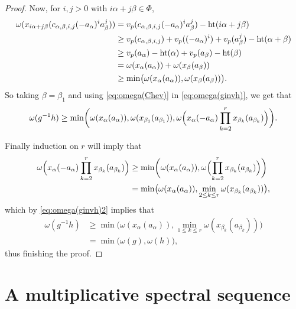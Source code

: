 \begin{proof}
Now, for $i,j>0$ with $i\alpha+j\beta \in \Phi$,
\begin{equation}\label{eq:omega(Chev)}
  \begin{aligned}
    \omega(x_{i\alpha+j\beta}(c_{\alpha,\beta,i,j}(-a_\alpha)^{i}a_\beta^{j})) &= v_p(c_{\alpha,\beta,i,j}(-a_\alpha)^{i}a_\beta^{j}) - \operatorname{ht}(i\alpha+j\beta) \\*
    &\geq v_p(c_{\alpha,\beta,i,j}) + v_p((-a_\alpha)^{i}) + v_p(a_\beta^{j}) - \operatorname{ht}(\alpha+\beta) \\*
    &\geq v_p(a_\alpha) - \operatorname{ht}(\alpha) + v_p(a_\beta) - \operatorname{ht}(\beta) \\*
    &= \omega(x_\alpha(a_\alpha)) + \omega(x_\beta(a_\beta)) \\*
    &\geq \min\bigl( \omega(x_\alpha(a_\alpha)), \omega(x_\beta(a_\beta)) \bigr).
  \end{aligned}
\end{equation}
So taking $\beta = \beta_1$ and using \eqref{eq:omega(Chev)} in \eqref{eq:omega(ginvh)}, we get that
\begin{equation}\label{eq:omega(ginvh)2}
  \omega(g^{-1}h) \geq \min\biggl( \omega(x_\alpha(a_\alpha)), \omega(x_{\beta_1}(a_{\beta_1})), \omega\Bigl( x_\alpha(-a_\alpha)\prod_{k=2}^r x_{\beta_k}(a_{\beta_k}) \Bigr) \biggr).
\end{equation}

Finally induction on $r$ will imply that
\begin{align*}
  \omega\Bigl( x_\alpha(-a_\alpha)\prod_{k=2}^r x_{\beta_k}(a_{\beta_k}) \Bigr) &\geq \min\biggl( \omega(x_\alpha(a_\alpha)), \omega\Bigl( \prod_{k=2}^r x_{\beta_k}(a_{\beta_k}) \Bigr) \biggr) \\
                                                     &= \min\bigl( \omega(x_\alpha(a_\alpha)), \min_{2 \leq k \leq r} \omega(x_{\beta_k}(a_{\beta_k})) \bigr),
\end{align*}
which by \eqref{eq:omega(ginvh)2} implies that
\begin{align*}
  \omega(g^{-1}h) &\geq \min\bigl( \omega(x_\alpha(a_\alpha)), \min_{1 \leq k \leq r} \omega(x_{\beta_k}(a_{\beta_k})) \bigr) \\
             &= \min\bigl( \omega(g), \omega(h) \bigr),
\end{align*}
thus finishing the proof.
\end{proof}

\section{A multiplicative spectral sequence}\label{sec:specsec}

